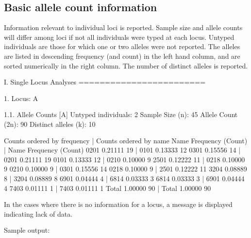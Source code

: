 \documentclass[letterpaper,10pt,english,openany,oneside]{sphinxmanual}
\begin{document}
\subsection{Basic allele count information}
\label{\detokenize{docs/guide-chapter-instructions:basic-allele-count-information}}\label{\detokenize{docs/guide-chapter-instructions:instructions-allelecounts}}
\sphinxAtStartPar
Information relevant to individual loci is reported. Sample size and
allele counts will differ among loci if not all individuals were typed
at each locus. Untyped individuals are those for which one or two
alleles were not reported. The alleles are listed in descending
frequency (and count) in the left hand column, and are sorted
numerically in the right column. The number of distinct alleles  is
reported.

\begin{sphinxVerbatim}[commandchars=\\\{\}]
I. Single Locus Analyses
========================

1. Locus: A
\PYGZus{}\PYGZus{}\PYGZus{}\PYGZus{}\PYGZus{}\PYGZus{}\PYGZus{}\PYGZus{}\PYGZus{}\PYGZus{}\PYGZus{}

1.1. Allele Counts [A]
\PYGZhy{}\PYGZhy{}\PYGZhy{}\PYGZhy{}\PYGZhy{}\PYGZhy{}\PYGZhy{}\PYGZhy{}\PYGZhy{}\PYGZhy{}\PYGZhy{}\PYGZhy{}\PYGZhy{}\PYGZhy{}\PYGZhy{}\PYGZhy{}\PYGZhy{}\PYGZhy{}\PYGZhy{}\PYGZhy{}\PYGZhy{}\PYGZhy{}
Untyped individuals: 2
Sample Size (n): 45
Allele Count (2n): 90
Distinct alleles (k): 10

Counts ordered by frequency   | Counts ordered by name
Name      Frequency (Count)   | Name      Frequency (Count)
0201      0.21111   19        | 0101      0.13333   12
0301      0.15556   14        | 0201      0.21111   19
0101      0.13333   12        | 0210      0.10000   9
2501      0.12222   11        | 0218      0.10000   9
0210      0.10000   9         | 0301      0.15556   14
0218      0.10000   9         | 2501      0.12222   11
3204      0.08889   8         | 3204      0.08889   8
6901      0.04444   4         | 6814      0.03333   3
6814      0.03333   3         | 6901      0.04444   4
7403      0.01111   1         | 7403      0.01111   1
Total     1.00000   90        | Total     1.00000   90
\end{sphinxVerbatim}

\sphinxAtStartPar
In the cases where there is no information for a locus, a message is
displayed indicating lack of data.

\sphinxAtStartPar
Sample output:
\end{document}
